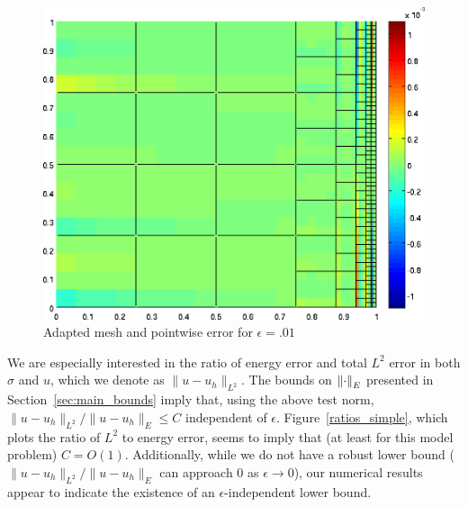 \begin{figure}[h!]
\centering
\includegraphics[scale=.5]{figs/u_pointdiff_wallBC.png}
\caption{Adapted mesh and pointwise error for $\epsilon=.01$}
\end{figure}
We are especially interested in the ratio of energy error and total $L^2$ error in both $\sigma$ and $u$, which we denote as $\|u-u_h\|_{L^2}$.  The bounds on $\nor{\cdot}_E$ presented in Section~\ref{sec:main_bounds} imply that, using the above test norm, $\|u-u_h\|_{L^2} / \|u-u_h\|_E \leq C$ independent of $\epsilon$.  Figure~\ref{ratios_simple}, which plots the ratio of $L^2$ to energy error, seems to imply that (at least for this model problem) $C=O(1)$.  Additionally, while we do not have a robust lower bound ($\|u-u_h\|_{L^2} / \|u-u_h\|_E$ can approach $0$ as $\epsilon \rightarrow 0$), our numerical results appear to indicate the existence of an $\epsilon$-independent lower bound. 

